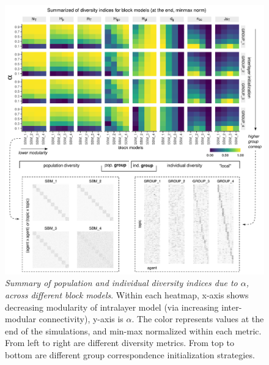 \begin{figure}[!ht]
    \centering
    \includegraphics[width=\textwidth]{figures/Fig3.pdf}
    \caption{
    \textit{Summary  of  population  and  individual  diversity  indices  due  to $\alpha$,  across  different  block  models}. Within each heatmap, x-axis shows decreasing modularity of intralayer model (via increasing inter-modular connectivity), y-axis is $\alpha$. The color represents values at the end of the simulations, and min-max normalized within each metric. From left to right are different diversity metrics. From top to bottom are different group correspondence initialization strategies.
    }
    \label{fig:3}
\end{figure}
